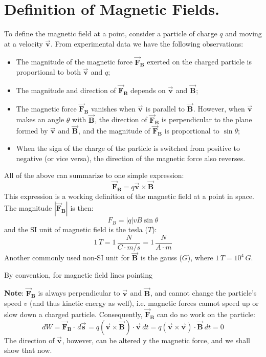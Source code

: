 \documentclass[11pt, letterpaper]{article}
\theoremstyle{definition}
\theoremstyle{remark}
\newcommand{\bv}[2][]{\bm{\vec{#2}_{#1}}}
\begin{document}
\section{Definition of Magnetic Fields.}\label{sec:def}
To define the magnetic field at a point, consider a particle of charge $q$ and moving at a velocity $\bv{v}$. From experimental data we have the following observations:
\begin{itemize}
	\item The magnitude of the magnetic force $\bv[B]{F}$ exerted on the charged particle is proportional to both $\bv{v}$ and $q$;
	\item The magnitude and direction of $\bv[B]{F}$ depends on $\bv{v}$ and $\bv{B}$;
	\item The magnetic force $\bv[B]{F}$ vanishes when $\bv{v}$ is parallel to $\bv{B}$. However, when $\bv{v}$ makes an angle $\theta$ with $\bv{B}$, the direction of $\bv[B]{F}$ is perpendicular to the plane formed by $\bv{v}$ and $\bv{B}$, and the magnitude of $\bv[B]{F}$ is proportional to $\sin{\theta}$;
	\item When the sign of the charge of the particle is switched from positive to negative (or vice versa), the direction of the magnetic force also reverses.
\end{itemize}
All of the above can summarize to one simple expression: 
\begin{equation}\label{eqn:magnetic-force}
	\boxed{\bv[B]{F} = q\bv{v}\times\bv{B}}
\end{equation}
This expression is a working definition of the magnetic field at a point in space. The magnitude $|\bv[B]{F}|$ is then: \[F_B = |q|vB\sin{\theta}\] and the SI unit of magnetic field is the tesla ($T$): \[1\, T = 1\,\frac{N}{C\cdot m/s} = 1\,\frac{N}{A\cdot m}\] Another commonly used non-SI unit for $\bv{B}$ is the gauss ($G$), where $1\, T = 10^4\,G$. 

By convention, for magnetic field lines pointing 

\textbf{Note}: $\bv[B]{F}$ is always perpendicular to $\bv{v}$ and $\bv{B}$, and cannot change the particle's speed $v$ (and thus kinetic energy as well), i.e. magnetic forces cannot speed up or slow down a charged particle. Consequently, $\bv[B]{F}$ can do no work on the particle: \[dW = \bv[B]{F}\cdot\, d\bv{s} = q(\bv{v}\times\bv{B})\cdot\bv{v}\, dt = q(\bv{v}\times\bv{v})\cdot\bv{B}\, dt = 0\] The direction of $\bv{v}$, however, can be altered y the magnetic force, and we shall show that now.
\end{document}
